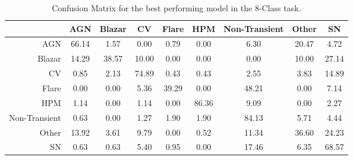 \begin{table*}
\centering
\begin{tabular}{|r|c|c|c|c|c|c|c|c|}
\hline
\multicolumn{1}{|l|}{} & AGN    & Blazar    & CV   & Flare   & HPM   & Non-Transient   & Other   & SN  \\ \hline \hline
AGN                & 66.14       & 1.57       & 0.00      & 0.79      & 0.00      & 6.30      & 20.47      & 4.72     \\ \hline
Blazar                & 14.29       & 38.57       & 10.00      & 0.00      & 0.00      & 0.00      & 10.00      & 27.14     \\ \hline
CV                & 0.85       & 2.13       & 74.89      & 0.43      & 0.43      & 2.55      & 3.83      & 14.89     \\ \hline
Flare                & 0.00       & 0.00       & 5.36      & 39.29      & 0.00      & 48.21      & 0.00      & 7.14     \\ \hline
HPM                & 1.14       & 0.00       & 1.14      & 0.00      & 86.36      & 9.09      & 0.00      & 2.27     \\ \hline
Non-Transient                & 0.63       & 0.00       & 1.27      & 1.90      & 1.90      & 84.13      & 5.71      & 4.44     \\ \hline
Other                & 13.92       & 3.61       & 9.79      & 0.00      & 0.52      & 11.34      & 36.60      & 24.23     \\ \hline
SN                & 0.63       & 0.63       & 5.40      & 0.95      & 0.00      & 17.46      & 6.35      & 68.57     \\ \hline
\end{tabular}
\caption{Confusion Matrix for the best performing model in the 8-Class task.}
\label{Confusion-8-Class}
\end{table*}
